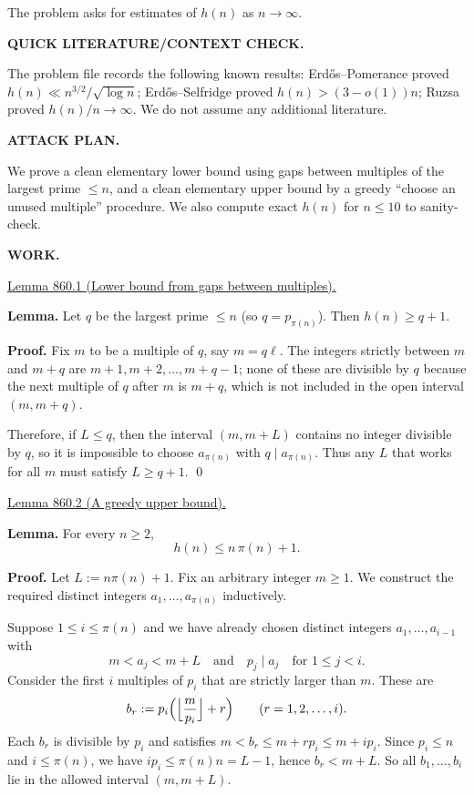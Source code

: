 The problem asks for estimates of $h(n)$ as $n\to\infty$.

\medskip
\noindent\textbf{QUICK LITERATURE/CONTEXT CHECK.}

The problem file records the following known results: Erd\H{o}s--Pomerance proved $h(n)\ll n^{3/2}/\sqrt{\log n}$; Erd\H{o}s--Selfridge proved $h(n)>(3-o(1))n$; Ruzsa proved $h(n)/n\to\infty$. We do not assume any additional literature.

\medskip
\noindent\textbf{ATTACK PLAN.}

We prove a clean elementary lower bound using gaps between multiples of the largest prime $\le n$, and a clean elementary upper bound by a greedy ``choose an unused multiple'' procedure.
We also compute exact $h(n)$ for $n\le 10$ to sanity-check.

\medskip
\noindent\textbf{WORK.}

\medskip
\noindent\underline{Lemma 860.1 (Lower bound from gaps between multiples).}

\textbf{Lemma.}
Let $q$ be the largest prime $\le n$ (so $q=p_{\pi(n)}$). Then $h(n)\ge q+1$.

\textbf{Proof.}
Fix $m$ to be a multiple of $q$, say $m=q\ell$.
The integers strictly between $m$ and $m+q$ are $m+1,m+2,\dots,m+q-1$; none of these are divisible by $q$ because the next multiple of $q$ after $m$ is $m+q$, which is not included in the open interval $(m,m+q)$.

Therefore, if $L\le q$, then the interval $(m,m+L)$ contains no integer divisible by $q$, so it is impossible to choose $a_{\pi(n)}$ with $q\mid a_{\pi(n)}$.
Thus any $L$ that works for all $m$ must satisfy $L\ge q+1$.
\qed

\medskip
\noindent\underline{Lemma 860.2 (A greedy upper bound).}

\textbf{Lemma.}
For every $n\ge 2$,
\[
 h(n) \le n\,\pi(n) + 1.
\]

\textbf{Proof.}
Let $L:=n\pi(n)+1$. Fix an arbitrary integer $m\ge 1$.
We construct the required distinct integers $a_1,\dots,a_{\pi(n)}$ inductively.

Suppose $1\le i\le \pi(n)$ and we have already chosen distinct integers $a_1,\dots,a_{i-1}$ with
\[
 m<a_j<m+L\quad\text{and}\quad p_j\mid a_j\quad\text{for }1\le j<i.
\]
Consider the first $i$ multiples of $p_i$ that are strictly larger than $m$.
These are
\[
 b_r := p_i\Bigl(\Bigl\lfloor \frac{m}{p_i}\Bigr\rfloor + r\Bigr)\qquad (r=1,2,\dots,i).
\]
Each $b_r$ is divisible by $p_i$ and satisfies $m < b_r \le m + r p_i \le m + i p_i$.
Since $p_i\le n$ and $i\le \pi(n)$, we have $i p_i \le \pi(n) n = L-1$, hence $b_r < m+L$.
So all $b_1,\dots,b_i$ lie in the allowed interval $(m,m+L)$.

